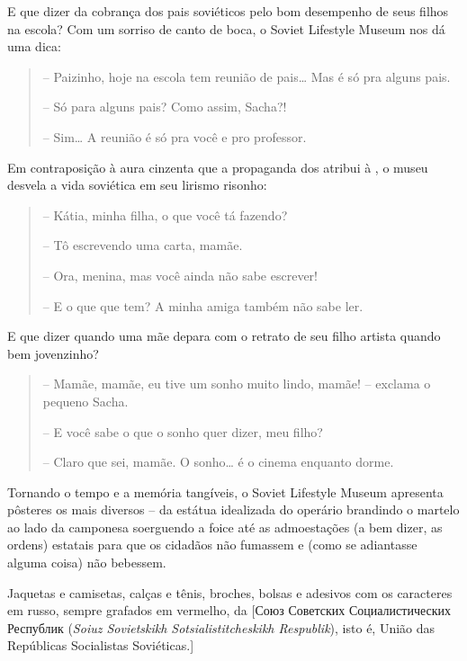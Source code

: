 E que dizer da cobrança dos pais soviéticos pelo bom desempenho de seus
filhos na escola? Com um sorriso de canto de boca, o Soviet Lifestyle
Museum nos dá uma dica:

\begin{quote}
\forceindent{}-- Paizinho, hoje na escola tem reunião de pais\ldots{} Mas é só pra alguns
pais.

-- Só para alguns pais? Como assim, Sacha?!

-- Sim\ldots{} A reunião é só pra você e pro professor.
\end{quote}

Em contraposição à aura cinzenta que a propaganda dos  atribui à
, o museu desvela a vida soviética em seu lirismo risonho:

\begin{quote}
\forceindent{}-- Kátia, minha filha, o que você tá fazendo?

-- Tô escrevendo uma carta, mamãe.

-- Ora, menina, mas você ainda não sabe escrever!

-- E o que que tem? A minha amiga também não sabe ler.
\end{quote}

E que dizer quando uma mãe depara com o retrato de seu filho artista
quando bem jovenzinho?

\begin{quote}
\forceindent{}-- Mamãe, mamãe, eu tive um sonho muito lindo, mamãe! -- exclama o
pequeno Sacha.

-- E você sabe o que o sonho quer dizer, meu filho?

-- Claro que sei, mamãe. O sonho\ldots{} é o cinema enquanto dorme.
\end{quote}

Tornando o tempo e a memória tangíveis, o Soviet Lifestyle Museum
apresenta pôsteres os mais diversos -- da estátua idealizada do operário
brandindo o martelo ao lado da camponesa soerguendo a foice até as
admoestações (a bem dizer, as ordens) estatais para que os cidadãos não
fumassem e (como se adiantasse alguma coisa) não bebessem.

Jaquetas e camisetas, calças e tênis, broches, bolsas e adesivos com os
caracteres em russo, sempre grafados em vermelho, da  {[}Союз
Советских Социалистических Республик (\emph{Soiuz Sovietskikh
Sotsialistitcheskikh Respublik}), isto é, União das Repúblicas
Socialistas Soviéticas.{]}

